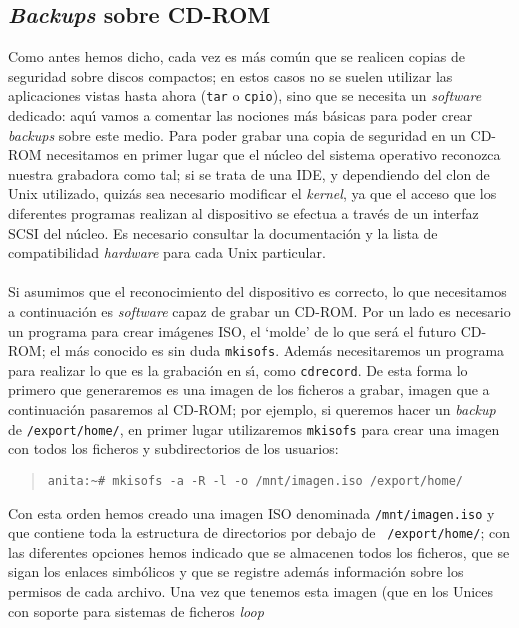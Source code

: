 \subsection{{\it Backups} sobre CD-ROM} 
\label{cdrom}
Como antes hemos dicho, cada vez es m\'as com\'un que se realicen copias de
seguridad sobre discos compactos; en estos casos no se suelen utilizar las
aplicaciones vistas hasta ahora ({\tt tar} o {\tt cpio}), sino que se necesita
un {\it software} dedicado: aqu\'{\i} vamos a comentar las nociones 
m\'as b\'asicas para poder crear {\it backups} sobre este medio.
Para poder grabar una copia de seguridad en un CD-ROM necesitamos en primer
lugar que el n\'ucleo del sistema operativo reconozca nuestra grabadora como 
tal; si se trata
de una IDE, y dependiendo del clon de Unix utilizado, quiz\'as sea necesario
modificar el {\it kernel}, ya que el acceso que los diferentes programas 
realizan al dispositivo se efectua a trav\'es de un interfaz SCSI del n\'ucleo.
Es necesario consultar la documentaci\'on y la lista de compatibilidad {\it
hardware} para cada Unix particular.\\
\\Si asumimos que el reconocimiento del dispositivo es correcto, lo que 
necesitamos a continuaci\'on es {\it software} capaz de grabar un CD-ROM. Por
un lado es necesario un programa para crear im\'agenes ISO, el `molde' de lo
que ser\'a el futuro CD-ROM; el m\'as conocido es sin duda {\tt mkisofs}. 
Adem\'as necesitaremos un programa para realizar lo que es la grabaci\'on en
s\'{\i}, como {\tt cdrecord}. De esta forma lo primero que generaremos es una
imagen de los ficheros a grabar, imagen que a continuaci\'on pasaremos al
CD-ROM; por ejemplo, si queremos hacer un {\it backup} de {\tt /export/home/},
en primer lugar utilizaremos {\tt mkisofs} para crear una imagen con todos
los ficheros y subdirectorios de los usuarios:
\begin{quote}
\begin{verbatim}
anita:~# mkisofs -a -R -l -o /mnt/imagen.iso /export/home/
\end{verbatim}
\end{quote}
Con esta orden hemos creado una imagen ISO denominada {\tt /mnt/imagen.iso} y
que contiene toda la estructura de directorios por debajo de {\tt 
/export/home/}; con las diferentes opciones hemos indicado que se almacenen
todos los ficheros, que se sigan los enlaces simb\'olicos y que se registre
adem\'as informaci\'on sobre los permisos de cada archivo. Una vez que tenemos
esta imagen (que en los Unices con soporte para sistemas de ficheros {\it loop}
